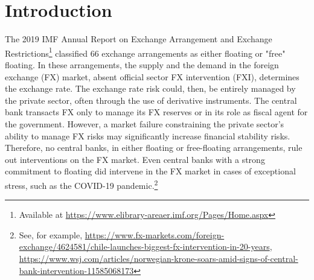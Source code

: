 \documentclass[11pt]{article}
\begin{document}
\thispagestyle{empty} 
\newpage
{}







\newpage
{} %

\section{Introduction}
\label{sec:introduction}

The   2019  IMF   Annual   Report  on   Exchange   Arrangement  and   Exchange
Restrictions\footnote{Available at \url{https://www.elibrary-areaer.imf.org/Pages/Home.aspx}}
classified 66 exchange arrangements as  either floating or "free" floating. In
these arrangements,  the supply and  the demand  in the foreign  exchange (FX)
market, absent official sector FX  intervention (FXI), determines the exchange
rate. The exchange  rate risk could, then, be entirely  managed by the private
sector,  often through  the use  of derivative  instruments. The  central bank
transacts FX only to manage its FX reserves or in its role as fiscal agent for
the government.  However,  a market failure constraining  the private sector’s
ability  to manage  FX risks  may significantly  increase financial  stability
risks.   Therefore, no  central  banks, in  either  floating or  free-floating
arrangements, rule out interventions on the FX market. Even central banks with
a strong  commitment to floating  did intervene in the  FX market in  cases of
exceptional stress, such as  the COVID-19 pandemic.\footnote{See, for example,
\url{https://www.fx-markets.com/foreign-exchange/4624581/chile-launches-biggest-fx-intervention-in-20-years},
\url{https://www.wsj.com/articles/norwegian-krone-soars-amid-signs-of-central-bank-intervention-11585068173}}\\
\end{document}
